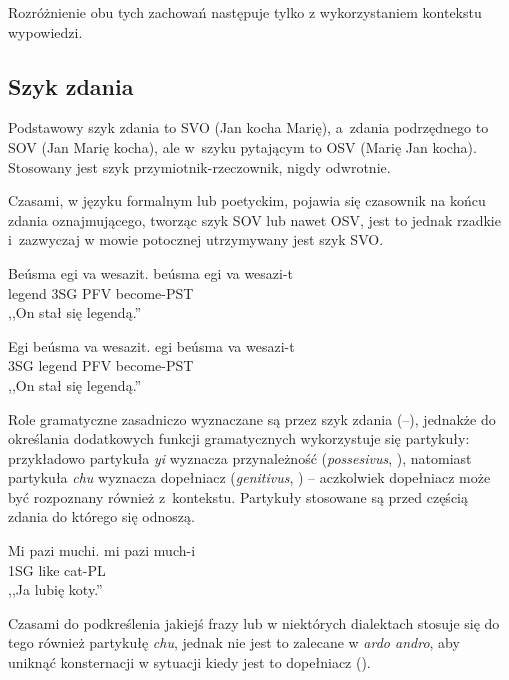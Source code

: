 \begin{spacing}{1.1}
Rozróżnienie obu tych zachowań następuje tylko z wykorzystaniem kontekstu
wypowiedzi.

\subsection{Szyk zdania}

Podstawowy szyk zdania to SVO (Jan kocha Marię), a~zdania podrzędnego to SOV
(Jan Marię kocha), ale w~szyku pytającym to OSV (Marię Jan kocha). Stosowany
jest szyk przymiotnik-rzeczownik, nigdy odwrotnie.

Czasami, w języku formalnym lub poetyckim, pojawia się czasownik na końcu zdania
oznajmującego, tworząc szyk SOV lub nawet OSV, jest to jednak rzadkie
i~zazwyczaj w mowie potocznej utrzymywany jest szyk SVO.

\begin{exe}
	\ex
	\trans Beúsma egi va wesazit.
	\gll  beúsma egi va wesazi-t \\
	  legend 3SG PFV become-PST \\
	\glt  ,,On stał się legendą.''
\end{exe}

\begin{exe}
	\ex
	\trans Egi beúsma va wesazit.
	\gll  egi beúsma va wesazi-t \\
	  3SG legend PFV become-PST \\
	\glt  ,,On stał się legendą.''
\end{exe}

Role gramatyczne zasadniczo wyznaczane są przez szyk zdania (\Nom{}--\Acc{}),
jednakże do określania dodatkowych funkcji gramatycznych wykorzystuje się
partykuły: przykładowo partykuła \emph{yi} wyznacza przynależność
(\emph{possesivus}, \Poss{}), natomiast partykuła \emph{chu} wyznacza
dopełniacz (\emph{genitivus}, \Gen{}) -- aczkolwiek dopełniacz może być
rozpoznany również z~kontekstu. Partykuły stosowane są przed częścią zdania do
którego się odnoszą.

\begin{exe}
	\ex
	\trans Mi pazi muchi.
	\gll  mi pazi much-i \\
	  1SG like cat-PL \\
	\glt  ,,Ja lubię koty.''
\end{exe}

Czasami do podkreślenia jakiejś frazy lub w niektórych dialektach stosuje się do
tego również partykułę \emph{chu}, jednak nie jest to zalecane w \emph{ardo
andro}, aby uniknąć konsternacji w sytuacji kiedy jest to dopełniacz
(\Gen{}).


\end{spacing}
